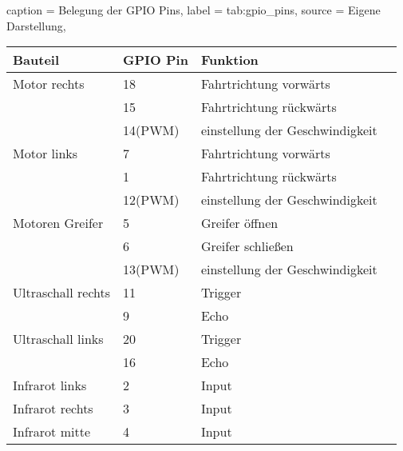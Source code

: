 \begin{dhbwtable}{%
    caption	= Belegung der GPIO Pins,
    label	= tab:gpio_pins,
    source	= Eigene Darstellung,
}
    \begin{tabular}{llll}
        \toprule
        \textbf{Bauteil}    & \textbf{GPIO Pin}     &\textbf{Funktion}   \\\midrule
        Motor rechts   	    & 18                    & Fahrtrichtung vorwärts\\
                            & 15                    & Fahrtrichtung rückwärts \\
                            & 14(PWM)               & einstellung der Geschwindigkeit\\
        Motor links   	    & 7                     & Fahrtrichtung vorwärts\\
                            & 1                     & Fahrtrichtung rückwärts \\
                            & 12(PWM)               & einstellung der Geschwindigkeit\\    
        Motoren Greifer   	& 5                     & Greifer öffnen\\
                            & 6                     & Greifer schließen \\
                            & 13(PWM)               & einstellung der Geschwindigkeit\\
        Ultraschall rechts 	& 11                    & Trigger\\
                            & 9                     & Echo \\
        Ultraschall links   & 20                    & Trigger\\
                            & 16                    & Echo \\ 
        Infrarot links      & 2                     & Input\\
        Infrarot rechts     & 3                     & Input\\
        Infrarot mitte      & 4                     & Input\\        
   \bottomrule
    \end{tabular}    
\end{dhbwtable}


